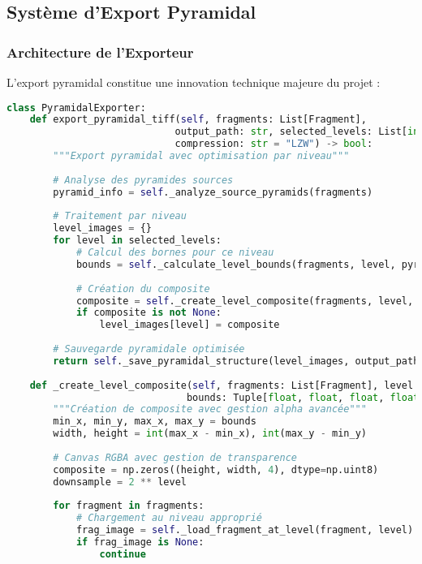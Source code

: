 \documentclass[12pt,a4paper]{report}
\begin{document}
\subsection{Système d'Export Pyramidal}

\subsubsection{Architecture de l'Exporteur}

L'export pyramidal constitue une innovation technique majeure du projet :

\begin{lstlisting}[language=Python]
class PyramidalExporter:
    def export_pyramidal_tiff(self, fragments: List[Fragment], 
                             output_path: str, selected_levels: List[int],
                             compression: str = "LZW") -> bool:
        """Export pyramidal avec optimisation par niveau"""
        
        # Analyse des pyramides sources
        pyramid_info = self._analyze_source_pyramids(fragments)
        
        # Traitement par niveau
        level_images = {}
        for level in selected_levels:
            # Calcul des bornes pour ce niveau
            bounds = self._calculate_level_bounds(fragments, level, pyramid_info)
            
            # Création du composite
            composite = self._create_level_composite(fragments, level, bounds)
            if composite is not None:
                level_images[level] = composite
        
        # Sauvegarde pyramidale optimisée
        return self._save_pyramidal_structure(level_images, output_path, compression)
    
    def _create_level_composite(self, fragments: List[Fragment], level: int,
                               bounds: Tuple[float, float, float, float]) -> np.ndarray:
        """Création de composite avec gestion alpha avancée"""
        min_x, min_y, max_x, max_y = bounds
        width, height = int(max_x - min_x), int(max_y - min_y)
        
        # Canvas RGBA avec gestion de transparence
        composite = np.zeros((height, width, 4), dtype=np.uint8)
        downsample = 2 ** level
        
        for fragment in fragments:
            # Chargement au niveau approprié
            frag_image = self._load_fragment_at_level(fragment, level)
            if frag_image is None:
                continue
            

\end{lstlisting}
\end{document}
